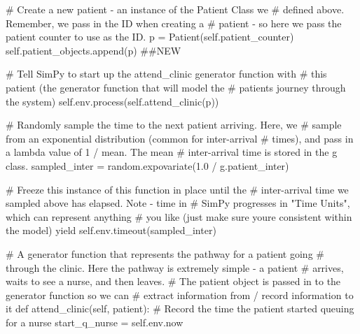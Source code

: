 \documentclass[
  letterpaper,
  DIV=11,
  numbers=noendperiod]{scrreprt}
\newenvironment{Shaded}{}{}
\newcommand{\CommentTok}[1]{\textcolor[rgb]{0.42,0.45,0.49}{#1}}
\newcommand{\ControlFlowTok}[1]{\textcolor[rgb]{0.84,0.23,0.29}{#1}}
\newcommand{\FloatTok}[1]{\textcolor[rgb]{0.00,0.36,0.77}{#1}}
\newcommand{\KeywordTok}[1]{\textcolor[rgb]{0.84,0.23,0.29}{#1}}
\newcommand{\NormalTok}[1]{\textcolor[rgb]{0.14,0.16,0.18}{#1}}
\newcommand{\OperatorTok}[1]{\textcolor[rgb]{0.14,0.16,0.18}{#1}}
\newcommand{\VariableTok}[1]{\textcolor[rgb]{0.89,0.38,0.04}{#1}}
\begin{document}
\begin{tcolorbox}
\begin{Shaded}
\begin{Highlighting}[]
            \CommentTok{\# Create a new patient {-} an instance of the Patient Class we}
            \CommentTok{\# defined above.  Remember, we pass in the ID when creating a}
            \CommentTok{\# patient {-} so here we pass the patient counter to use as the ID.}
\NormalTok{            p }\OperatorTok{=}\NormalTok{ Patient(}\VariableTok{self}\NormalTok{.patient\_counter)}
            \VariableTok{self}\NormalTok{.patient\_objects.append(p) }\CommentTok{\#\#NEW}

            \CommentTok{\# Tell SimPy to start up the attend\_clinic generator function with}
            \CommentTok{\# this patient (the generator function that will model the}
            \CommentTok{\# patient\textquotesingle{}s journey through the system)}
            \VariableTok{self}\NormalTok{.env.process(}\VariableTok{self}\NormalTok{.attend\_clinic(p))}

            \CommentTok{\# Randomly sample the time to the next patient arriving.  Here, we}
            \CommentTok{\# sample from an exponential distribution (common for inter{-}arrival}
            \CommentTok{\# times), and pass in a lambda value of 1 / mean.  The mean}
            \CommentTok{\# inter{-}arrival time is stored in the g class.}
\NormalTok{            sampled\_inter }\OperatorTok{=}\NormalTok{ random.expovariate(}\FloatTok{1.0} \OperatorTok{/}\NormalTok{ g.patient\_inter)}

            \CommentTok{\# Freeze this instance of this function in place until the}
            \CommentTok{\# inter{-}arrival time we sampled above has elapsed.  Note {-} time in}
            \CommentTok{\# SimPy progresses in "Time Units", which can represent anything}
            \CommentTok{\# you like (just make sure you\textquotesingle{}re consistent within the model)}
            \ControlFlowTok{yield} \VariableTok{self}\NormalTok{.env.timeout(sampled\_inter)}

    \CommentTok{\# A generator function that represents the pathway for a patient going}
    \CommentTok{\# through the clinic.  Here the pathway is extremely simple {-} a patient}
    \CommentTok{\# arrives, waits to see a nurse, and then leaves.}
    \CommentTok{\# The patient object is passed in to the generator function so we can}
    \CommentTok{\# extract information from / record information to it}
    \KeywordTok{def}\NormalTok{ attend\_clinic(}\VariableTok{self}\NormalTok{, patient):}
        \CommentTok{\# Record the time the patient started queuing for a nurse}
\NormalTok{        start\_q\_nurse }\OperatorTok{=} \VariableTok{self}\NormalTok{.env.now}


\end{Highlighting}
\end{Shaded}
\end{tcolorbox}
\end{document}
